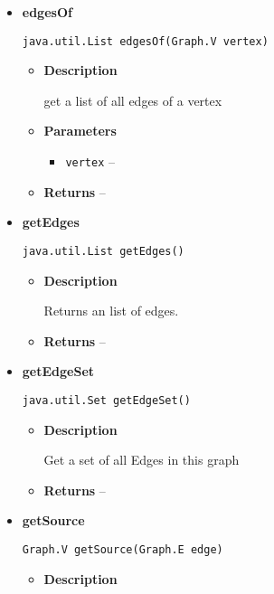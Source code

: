 {{{{{\begin{itemize}
{\begin{itemize}
{Adds a new Vertex to the graph
}
\item{
{\bf  Parameters}
  \begin{itemize}
   \item{
\texttt{vertex} -- }
  \end{itemize}
}%
\end{itemize}
}%
\item{ 
{\bf  edgesOf}\\
\begin{lstlisting}[frame=none]
java.util.List edgesOf(Graph.V vertex)\end{lstlisting} %
\begin{itemize}
\item{
{\bf  Description}

get a list of all edges of a vertex
}
\item{
{\bf  Parameters}
  \begin{itemize}
   \item{
\texttt{vertex} -- }
  \end{itemize}
}%
\item{{\bf  Returns} -- 
 
}%
\end{itemize}
}%
\item{ 
{\bf  getEdges}\\
\begin{lstlisting}[frame=none]
java.util.List getEdges()\end{lstlisting} %
\begin{itemize}
\item{
{\bf  Description}

Returns an list of edges.
}
\item{{\bf  Returns} -- 
 
}%
\end{itemize}
}%
\item{ 
{\bf  getEdgeSet}\\
\begin{lstlisting}[frame=none]
java.util.Set getEdgeSet()\end{lstlisting} %
\begin{itemize}
\item{
{\bf  Description}

Get a set of all Edges in this graph
}
\item{{\bf  Returns} -- 
 
}%
\end{itemize}
}%
\item{ 
{\bf  getSource}\\
\begin{lstlisting}[frame=none]
Graph.V getSource(Graph.E edge)\end{lstlisting} %
\begin{itemize}
\item{
{\bf  Description}

}
\end{itemize}}
\end{itemize}}}}}}
